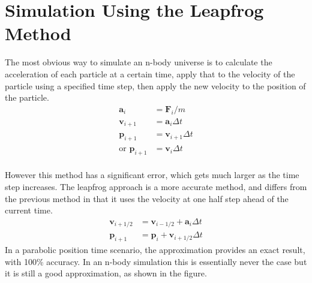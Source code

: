 \documentclass{article}
\begin{document}
\section{Simulation Using the Leapfrog Method}
The most obvious way to simulate an n-body universe is to calculate the acceleration of each particle at a certain time, apply that to the velocity of the particle using a specified time step, then apply the new velocity to the position of the particle.
\begin{align*}
	\mathbf{a}_i &= \mathbf{F}_i/m\\
	\mathbf{v}_{i+1} &= \mathbf{a}_i \Delta t\\
	\mathbf{p}_{i+1} &= \mathbf{v}_{i+1} \Delta t\\ \text{or  }
	\mathbf{p}_{i+1} &= \mathbf{v}_i \Delta t
\end{align*}
\paragraph{}
However this method has a significant error, which gets much larger as the time step increases.
The leapfrog approach is a more accurate method, and differs from the previous method in that it uses the velocity at one half step ahead of the current time.
\begin{align*}
	\mathbf{v}_{i+1/2} &= \mathbf{v}_{i-1/2} + \mathbf{a}_i \Delta t  \\
	\mathbf{p}_{i+1}    &= \mathbf{p}_i + \mathbf{v}_{i + 1/2} \Delta t
\end{align*}
In a parabolic position time scenario, the approximation provides an exact result, with 100\% accuracy. 
In an n-body simulation this is essentially never the case but it is still a good approximation, as shown in the figure.\\
\begin{center}
\end{center}
\end{document}
